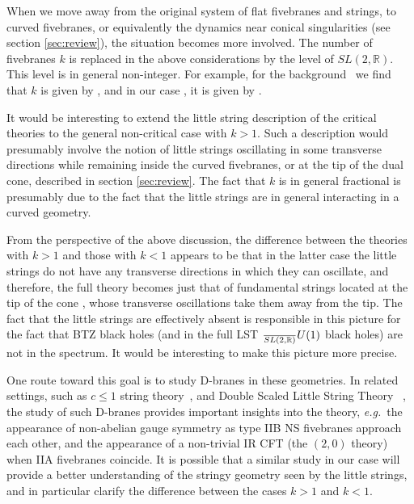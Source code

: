 \documentclass[12pt]{article}
\def\sltwo{\ensuremath{SL(2,\bR)}}
\def\uone{U(1)}
\def\eg{{e.g.}}
\newcommand{\bR}{{\mathbb R}}
\numberwithin{equation}{section}
\def\eg{{\it e.g.}}
\def\eg{{\it e.g.}}
\begin{document}
When we move away from the original system of flat fivebranes and strings, to curved fivebranes, or equivalently the dynamics near conical singularities (see section \ref{sec:review}), the situation becomes more involved. The number of fivebranes $k$ is replaced in the above considerations by the level of $SL(2,\bR)$. This level is in general non-integer. For example, for the background \ardougads\ we find that $k$ is given by \knad, and in our case \klessone, it is given by \kntwod. 

It would be interesting to extend the little string description of the critical theories to the general non-critical case with $k>1$. Such a description would presumably involve the notion of little strings oscillating in some transverse directions while remaining inside the curved fivebranes, or at the tip of the dual cone, described in section \ref{sec:review}. The fact that $k$ is in general fractional is presumably due to the fact that the little strings are in general interacting in a curved geometry.  

From the perspective of the above discussion, the difference between the theories with $k>1$ and those with $k<1$ appears to be that in the latter case the little strings do not have any transverse directions in which they can oscillate, and therefore, the full theory becomes just that of fundamental strings located at the tip of the cone \cccnnn, whose transverse oscillations take them away from the tip. The fact that the little strings are effectively absent is responsible in this picture for the fact that BTZ black holes (and in the full LST $\frac\sltwo\uone$ black holes) are not in the spectrum. It would be interesting to make this picture more precise. 

One route toward this goal is to study D-branes in these geometries. In related settings, such as $c\le 1$ string theory~, 
and Double Scaled Little String Theory%
~, 
the study of such D-branes provides important insights into the theory, \eg\ the appearance of non-abelian gauge symmetry as type IIB NS fivebranes approach each other, and the appearance of a non-trivial IR CFT (the $(2,0)$ theory) when IIA fivebranes coincide. It is possible that a similar study in our case will provide a better understanding of the stringy geometry seen by the little strings, and in particular clarify the difference between the cases $k>1$ and $k<1$. 
\end{document}
